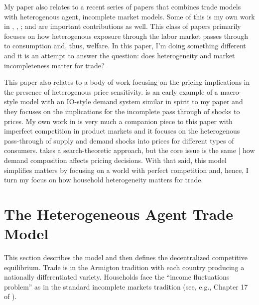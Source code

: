 \documentclass[12pt,pdftex]{article}
\begin{document}
\begin{onehalfspacing}
My paper also relates to a recent series of papers that combines trade models with heterogenous agent, incomplete market models. Some of this is my own work in \citet{lyon2018redistributing}, \citet{lyon2019}, \citet{waugh_consumption}; \citet*{gaston2018} and \citet{carroll2020heterogeneous} are important contributions as well. This class of papers primarily focuses on how heterogenous exposure through the labor market passes through to consumption and, thus, welfare. In this paper, I'm doing something different and it is an attempt to answer the question: does heterogeneity and market incompleteness matter for trade?

This paper also relates to a body of work focusing on the pricing implications in the presence of heterogenous price sensitivity. \citet{nakamura2010accounting} is an early example of a macro-style model with an IO-style demand system similar in spirit to my paper and they focuses on the implications for the incomplete pass through of shocks to prices. My own work in \citet{p-iq} is very much a companion piece to this paper with imperfect competition in product markets and it focuses on the heterogenous pass-through of supply and demand shocks into prices for different types of consumers. \citet{nord2022shopping} takes a search-theoretic approach, but the core issue is the same | how demand composition affects pricing decisions. With that said, this model simplifies matters by focusing on a world with perfect competition and, hence, I turn my focus on how household heterogeneity matters for trade.


\section{The Heterogeneous Agent Trade Model}

This section describes the model and then defines the decentralized competitive equilibrium. Trade is in the Armigton tradition with each country producing a nationally differentiated variety. Households face the ``income fluctuations problem'' as in the standard incomplete markets tradition (see, e.g., Chapter 17 of \citet{ljungqvist2012recursive}).


\end{onehalfspacing}
\end{document}
